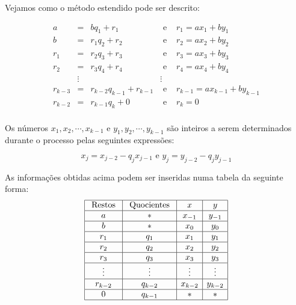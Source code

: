 Vejamos como o m\'{e}todo estendido pode ser descrito:

\[
\begin{array}{rclcl}
a   		& =      & bq_{1}+r_{1} 			    & \textrm{ e } & r_{1}=ax_{1}+by_{1}       \\
b   		& =      & r_{1}q_{2}+r_{2} 	    & \textrm{ e } & r_{2}=ax_{2}+by_{2}     \\
r_{1}		& =      & r_{2}q_{3}+r_{3} 	    & \textrm{ e } & r_{3}=ax_{3}+by_{3}     \\
r_{2}   & =      & r_{3}q_{4}+r_{4} 	    & \textrm{ e } & r_{4}=ax_{4}+by_{4}     \\
        & \vdots &     		          	    &  \vdots      &                     \\
r_{k-3} & =      & r_{k-2}q_{k-1}+r_{k-1} & \textrm{ e } & r_{k-1}=ax_{k-1}+by_{k-1} \\				
r_{k-2} & =      & r_{k-1}q_{k}+ 0        & \textrm{ e } & r_{k}=0 \\		
\end{array}
\]

Os n\'{u}meros $x_{1}, x_{2}, \cdots, x_{k-1}$ e $y_{1}, y_{2}, \cdots, y_{k-1}$ s\~{a}o inteiros a
serem determinados durante o processo pelas seguintes express\~{o}es:

$$x_{j}=x_{j-2}-q_{j}x_{j-1}\textrm{ \ \ e \ \ }  y_{j}=y_{j-2}-q_{j}y_{j-1}$$

As informa\c{c}\~{o}es obtidas acima podem ser inseridas numa tabela da seguinte forma:
\[
\begin{array}{|c|c|c|c|}\hline
\textrm{ Restos } & \textrm{ Quocientes } & x       & y \\ \hline
				a 	      & \ast     							& x_{-1}  & y_{-1} \\ \hline
				b  			  & \ast     							& x_{0}   & y_{0} \\ \hline
				r_{1}     & q_{1}   					 	  & x_{1}   & y_{1} \\ \hline
				r_{2}     & q_{2}    							& x_{2}   & y_{2} \\ \hline
				r_{3}     & q_{3}    							& x_{3}   & y_{3} \\ \hline  
				\vdots    & \vdots   							& \vdots  & \vdots \\ \hline
				r_{k-2}   & q_{k-2}  							& x_{k-2} & y_{k-2} \\ \hline
				0         & q_{k-1}  							& \ast    & \ast    \\ \hline
\end{array}
\]

